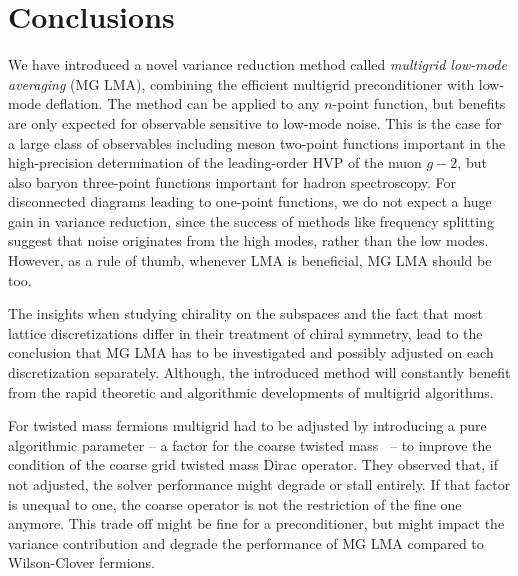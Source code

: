 \chapter{Conclusions}
\label{ch:p2:conclusions}



We have introduced a novel variance reduction method called \emph{multigrid low-mode averaging} (MG LMA), combining the efficient multigrid preconditioner with low-mode deflation.
The method can be applied to any $n$-point function, but benefits are only expected for observable sensitive to low-mode noise.
This is the case for a large class of observables including meson two-point functions important in the high-precision determination of the leading-order HVP of the muon $g-2$, but also baryon three-point functions important for hadron spectroscopy.
For disconnected diagrams leading to one-point functions, we do not expect a huge gain in variance reduction, since the success of methods like frequency splitting suggest that noise originates from the high modes, rather than the low modes.
However, as a rule of thumb, whenever LMA is beneficial, MG LMA should be too.

The insights when studying chirality on the subspaces and the fact that most lattice discretizations differ in their treatment of chiral symmetry, lead to the conclusion that MG LMA has to be investigated and possibly adjusted on each discretization separately.
Although, the introduced method will constantly benefit from the rapid theoretic and algorithmic developments of multigrid algorithms.

For twisted mass fermions multigrid had to be adjusted by introducing a pure algorithmic parameter -- a factor for the coarse twisted mass~\cite{Alexandrou:2016izb} -- to improve the condition of the coarse grid twisted mass Dirac operator.
They observed that, if not adjusted, the solver performance might degrade or stall entirely.
If that factor is unequal to one, the coarse operator is not the restriction of the fine one anymore.
This trade off might be fine for a preconditioner, but might impact the variance contribution and degrade the performance of MG LMA compared to Wilson-Clover fermions.

